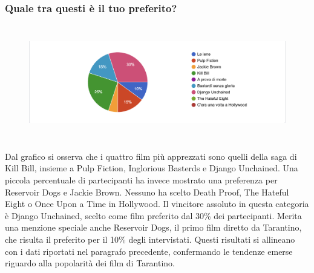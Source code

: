 \documentclass[12pt]{article} %
\begin{document}
\subsubsection*{Quale tra questi è il tuo preferito?}
\begin{flushleft}
\begin{figure}[H]
    \includegraphics[width = 15cm, height = 5cm]{grafico2.png}
\end{figure}
Dal grafico si osserva che i quattro film più apprezzati sono quelli della saga di Kill Bill, insieme a Pulp Fiction, Inglorious Basterds e Django Unchained. 
Una piccola percentuale di partecipanti ha invece mostrato una preferenza per Reservoir Dogs e Jackie Brown.
Nessuno ha scelto Death Proof, The Hateful Eight o Once Upon a Time in Hollywood.  
Il vincitore assoluto in questa categoria è Django Unchained, scelto come film preferito dal 30\% dei partecipanti. Merita una menzione speciale anche Reservoir Dogs, il primo film diretto da Tarantino, che risulta il preferito per il 10\% degli intervistati.  
Questi risultati si allineano con i dati riportati nel paragrafo precedente, confermando le tendenze emerse riguardo alla popolarità dei film di Tarantino.
\end{flushleft}
\break
\end{document}

